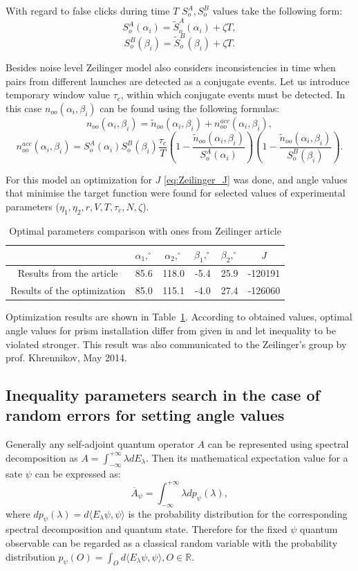 \documentclass[%
master,         %
subf,           %
href,           %
colorlinks=true %
]{disser}
\numberwithin{equation}{section}
\numberwithin{figure}{section}
\begin{document}
With regard to false clicks during time $T$ $S_o^A, S_o^B$ values take the following form:
\[
S_o^A(\alpha_i) = \tilde{S}_o^A(\alpha_i) + \zeta T,
\]
\[
S_o^B(\beta_i) = \tilde{S}_o^B(\beta_i) + \zeta T.
\]

Besides noise level Zeilinger model also considers inconsistencies in time when pairs from different 
launches are detected as a conjugate events. Let us introduce temporary window value $\tau_c$, within 
which conjugate events must be detected. In this case $n_{oo}(\alpha_i, \beta_i)$ can be found using 
the following formulas:
\[
n_{oo}(\alpha_i, \beta_i) = \tilde{n}_{oo}(\alpha_i, \beta_i) + n_{oo}^{acc}(\alpha_i, \beta_i),
\]
\[
n_{oo}^{acc}(\alpha_i, \beta_i) = S_o^A(\alpha_i)S_o^B(\beta_i)\frac{\tau_c}{T}\left(1 - \frac{\tilde{n}_{oo}(\alpha_i, \beta_i)}{S_o^A(\alpha_i)}\right) \left( 1 - \frac{\tilde{n}_{oo}(\alpha_i, \beta_i)}{S_o^B(\beta_i)}\right).
\]

For this model an optimization for $J$ \eqref{eq:Zeilinger_J} was done, and angle values that
minimise the target function were found for selected values of experimental parameters 
($\eta_1, \eta_2, r, V, T, \tau_c, N, \zeta$).

\begin{table}
\begin{tabular}{|c|c|c|c|c|c|}
\hline 
 & $\alpha_1, ^\circ$ & $\alpha_2, ^\circ$ & $\beta_1, ^\circ$ & $\beta_2, ^\circ$ & $J$ \\ 
\hline 
Results from the article & 85.6 & 118.0 & -5.4 & 25.9 & -120191 \\ 
\hline 
Results of the optimization & 85.0 & 115.1 & -4.0 & 27.4 & -126060 \\ 
\hline 
\end{tabular}
\caption{Optimal parameters comparison with ones from Zeilinger article \cite{Zeilinger}}
\label{tab:Zeilinger_parameters}
\end{table}

Optimization results are shown in Table~\ref{tab:Zeilinger_parameters}. According to obtained values, 
optimal angle values for prism installation differ from given in \cite{Zeilinger} and let inequality to be violated stronger. This result was also communicated to the Zeilinger's group by prof. Khrennikov, May 2014. 

\clearpage

\subsection{Inequality parameters search in the case of random errors for setting angle values}
Generally any self-adjoint quantum operator $A$ can be represented using spectral decomposition as 
$A = \int_{-\infty}^{+\infty}\lambda dE_\lambda$. Then its mathematical expectation value for a sate $\psi$ 
 can be expressed as:
\[
\overline{A}_\psi = \int_{-\infty}^{+\infty}\lambda dp_\psi (\lambda),
\]
where $dp_\psi (\lambda) = d\langle E_\lambda\psi, \psi\rangle$ is the probability distribution for the corresponding spectral decomposition and quantum state. Therefore for the fixed $\psi$ quantum observable can be regarded as a classical random variable with the probability distribution
$p_\psi (O) = \int_O d\langle E_\lambda\psi, \psi\rangle, O\in \mathbb{R}$.
\end{document}
